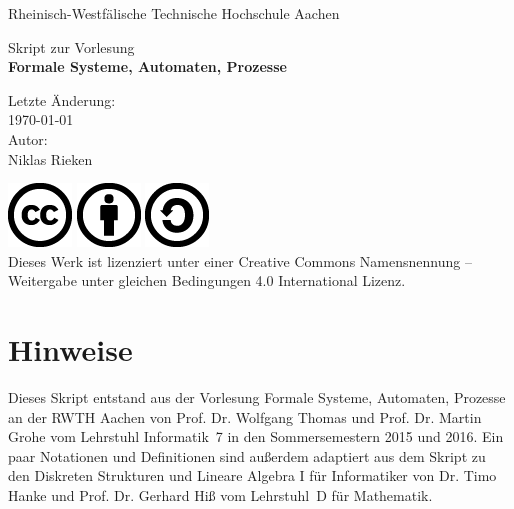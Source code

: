 \documentclass[11pt, a4paper]{article}
\theoremstyle{definition}
\theoremstyle{plain}
\numberwithin{equation}{section}
\begin{document}
\pagestyle{empty}
\begin{center}
    Rheinisch-Westf\"alische Technische Hochschule Aachen\\[10em]

    \begin{LARGE}
    		Skript zur Vorlesung\\[1.5em]
		\textbf{Formale Systeme, Automaten, Prozesse}
    \end{LARGE}
	\vfill
    \begin{Large}
    		Letzte Änderung:\\
    		\today\\[2em]
		Autor:\\
		Niklas Rieken\\
	\end{Large}
	\vfill
	\includegraphics[scale=.4]{icons/cc.png}
	\includegraphics[scale=.4]{icons/by.png}
	\includegraphics[scale=.4]{icons/sa.png}\\
	Dieses Werk ist lizenziert unter einer Creative Commons Namensnennung -- Weitergabe unter gleichen Bedingungen 4.0 International Lizenz.
\end{center}


\newpage
\vspace*{\fill}
\section*{Hinweise}
Dieses Skript entstand aus der Vorlesung Formale Systeme, Automaten, Prozesse an der RWTH Aachen von Prof. Dr. Wolfgang Thomas und Prof. Dr. Martin Grohe vom Lehrstuhl Informatik~7 in den Sommersemestern 2015 und 2016. Ein paar Notationen und Definitionen sind außerdem adaptiert aus dem Skript zu den Diskreten Strukturen und Lineare Algebra I für Informatiker von Dr. Timo Hanke und Prof. Dr. Gerhard Hiß vom Lehrstuhl~D für Mathematik.
\vspace*{\fill}
\end{document}
